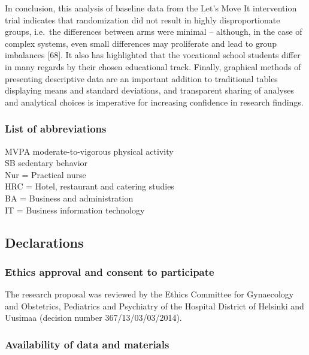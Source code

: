 \documentclass[english,man,floatsintext]{apa6}
\begin{document}
In conclusion, this analysis of baseline data from the Let's Move It intervention trial indicates that randomization did not result in highly disproportionate groups, i.e.~the differences between arms were minimal -- although, in the case of complex systems, even small differences may proliferate and lead to group imbalances {[}68{]}. It also has highlighted that the vocational school students differ in many regards by their chosen educational track. Finally, graphical methods of presenting descriptive data are an important addition to traditional tables displaying means and standard deviations, and transparent sharing of analyses and analytical choices is imperative for increasing confidence in research findings.

\hypertarget{list-of-abbreviations}{%
\subsubsection{List of abbreviations}\label{list-of-abbreviations}}

MVPA moderate-to-vigorous physical activity\\
SB sedentary behavior\\
Nur = Practical nurse\\
HRC = Hotel, restaurant and catering studies\\
BA = Business and administration\\
IT = Business information technology

\hypertarget{declarations}{%
\subsection{Declarations}\label{declarations}}

\hypertarget{ethics-approval-and-consent-to-participate}{%
\subsubsection{Ethics approval and consent to participate}\label{ethics-approval-and-consent-to-participate}}

The research proposal was reviewed by the Ethics Committee for Gynaecology and Obstetrics, Pediatrics and Psychiatry of the Hospital District of Helsinki and Uusimaa (decision number 367/13/03/03/2014).

\hypertarget{availability-of-data-and-materials}{%
\subsubsection{Availability of data and materials}\label{availability-of-data-and-materials}}
\end{document}
